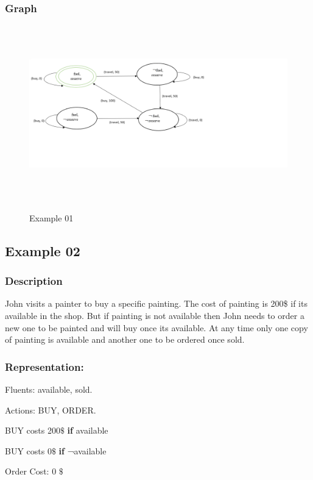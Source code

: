 \documentclass[11pt]{article}
\begin{document}
	\subsubsection{Graph}\label{par:p401}
	\begin{figure}[H]
		\centering
		\includegraphics[width=6in,height=3in]{./media/ex01.png}
		\label{Figure:f01}
		\caption{Example 01}
	\end{figure}
	\subsection{Example 02}\label{example:ex02}
	\subsubsection{Description}\label{par:p102}
	John visits a painter to buy a specific painting. The cost of painting is 200\$ if its available in the shop. But if painting is not available then John needs to order a new one to be painted and will buy once its available. At any time only one copy of painting is available and another one to be ordered once sold. 
	
	\subsubsection{Representation:}\label{par:p202}
	\indent 
	\par Fluents: available, sold.\par
	Actions: BUY, ORDER.\par
	BUY costs 200$\$$  \textbf{if} available\par
	
	BUY costs 0$\$$  \textbf{if} ¬available\par
	
	
	Order Cost: 0 $\$$
	
\end{document}
